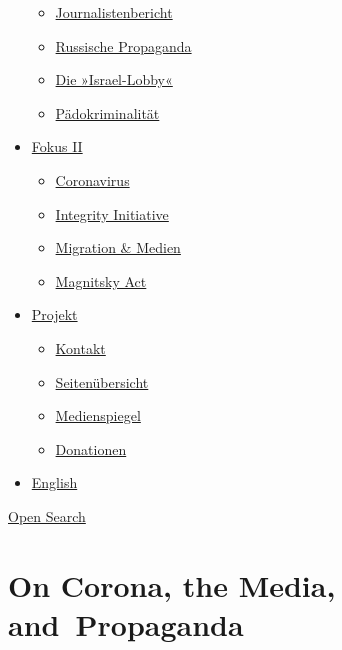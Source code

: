 \begin{itemize}
  \begin{itemize}
  \tightlist
  \item
    \href{https://swprs.org/bericht-eines-journalisten/}{Journalistenbericht}
  \item
    \href{https://swprs.org/russische-propaganda/}{Russische Propaganda}
  \item
    \href{https://swprs.org/die-israel-lobby-fakten-und-mythen/}{Die
    »Israel-Lobby«}
  \item
    \href{https://swprs.org/geopolitik-und-paedokriminalitaet/}{Pädokriminalität}
  \end{itemize}
\item
  \href{https://swprs.org/migration-und-medien/}{Fokus II}

  \begin{itemize}
  \tightlist
  \item
    \href{https://swprs.org/covid-19-hinweis-ii/}{Coronavirus}
  \item
    \href{https://swprs.org/die-integrity-initiative/}{Integrity
    Initiative}
  \item
    \href{https://swprs.org/migration-und-medien/}{Migration \& Medien}
  \item
    \href{https://swprs.org/der-fall-magnitsky/}{Magnitsky Act}
  \end{itemize}
\item
  \href{https://swprs.org/kontakt/}{Projekt}

  \begin{itemize}
  \tightlist
  \item
    \href{https://swprs.org/kontakt/}{Kontakt}
  \item
    \href{https://swprs.org/uebersicht/}{Seitenübersicht}
  \item
    \href{https://swprs.org/medienspiegel/}{Medienspiegel}
  \item
    \href{https://swprs.org/donationen/}{Donationen}
  \end{itemize}
\item
  \href{https://swprs.org/contact/}{English}
\end{itemize}

\protect\hyperlink{}{Open Search}

\hypertarget{on-corona-the-media-and-propaganda}{%
\section{On Corona, the Media,
and~Propaganda}\label{on-corona-the-media-and-propaganda}}

